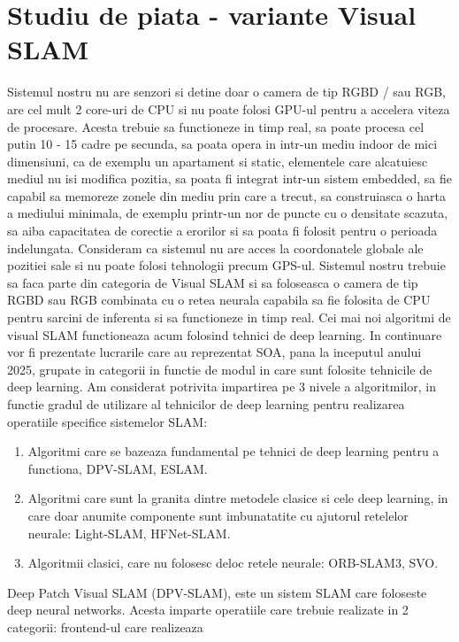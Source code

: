 \documentclass[12pt,a4paper]{report}
\begin{document}
\chapter{Studiu de piata {-} variante Visual SLAM}
Sistemul nostru nu are senzori si detine doar o camera de tip RGBD / sau RGB, are cel mult 2
core-uri de CPU si nu poate folosi GPU-ul pentru a accelera viteza de procesare. Acesta trebuie sa 
functioneze in timp real, sa poate procesa cel putin 10 {-} 15 cadre pe secunda, sa poata opera in
intr-un mediu indoor de mici dimensiuni, ca de exemplu un apartament si static, elementele care alcatuiesc
mediul nu isi modifica pozitia, sa poata fi integrat intr-un
sistem embedded, sa fie capabil sa memoreze zonele din mediu prin care a trecut, sa construiasca o harta a
mediului minimala, de exemplu printr-un nor de puncte cu o densitate scazuta, sa aiba capacitatea de 
corectie a erorilor si sa poata fi folosit pentru o perioada indelungata. Consideram ca sistemul nu 
are acces la coordonatele globale ale pozitiei sale si nu poate folosi tehnologii precum GPS-ul.
Sistemul nostru trebuie sa faca parte din categoria de Visual SLAM si sa foloseasca o camera de tip 
RGBD sau RGB combinata cu o retea neurala capabila sa fie folosita de CPU pentru sarcini de inferenta 
si sa functioneze in timp real. Cei mai noi algoritmi de visual SLAM functioneaza acum folosind tehnici
de deep learning. In continuare vor fi prezentate lucrarile care au reprezentat SOA, pana la inceputul 
anului 2025, grupate in categorii in functie de modul in care sunt folosite tehnicile de deep learning.
Am considerat potrivita impartirea pe 3 nivele a algoritmilor, in functie gradul de utilizare 
al tehnicilor de deep learning pentru realizarea operatiile specifice sistemelor SLAM:\@
\begin{enumerate}
    \item Algoritmi care se bazeaza fundamental pe tehnici de deep learning pentru a functiona, 
DPV-SLAM, ESLAM.\@
    \item Algoritmi care sunt la granita dintre metodele clasice si cele deep learning, in care 
doar anumite componente sunt imbunatatite cu ajutorul retelelor neurale: Light-SLAM, HFNet-SLAM.\@
    \item Algoritmii clasici, care nu folosesc deloc retele neurale: ORB-SLAM3, SVO.\@ 
\end{enumerate}   
Deep Patch Visual SLAM (DPV-SLAM), este un sistem SLAM care foloseste deep neural networks.
Acesta imparte operatiile care trebuie realizate in 2 categorii: frontend-ul care realizeaza 
\end{document}
